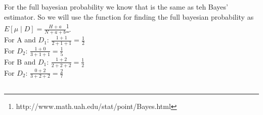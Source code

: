 \subsection{}
For the full bayesian probability we know that is the same as teh Bayes' estimator.
So we will use the function for finding the full bayesian probability as $E[\mu\mid D] = \frac{H+a}{N+a+b}$\footnote{http://www.math.uah.edu/stat/point/Bayes.html}.\\
For A and $D_1$: $\frac{1+1}{2+1+1} = \frac{1}{2}$\\
For $D_2$: $\frac{1+0}{3+1+1} = \frac{1}{5}$\\
For B and $D_1$: $\frac{1+2}{2+2+2} = \frac{1}{2}$\\
For $D_2$: $\frac{0+2}{3+2+2} = \frac{2}{7}$\\
\subsection{}

